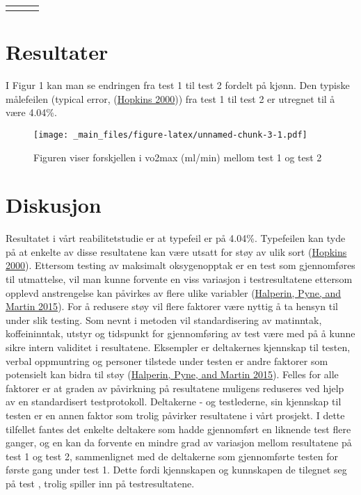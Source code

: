 \documentclass[
]{book}
\begin{document}
\begin{longtable}[c]{|p{1.08in}|p{1.02in}|p{1.02in}}
\noalign{\global\setlength{\arrayrulewidth}{2pt}}\arrayrulecolor[HTML]{666666}\cline{1-3}



\end{longtable}

\hypertarget{resultater}{%
\section{Resultater}\label{resultater}}

I Figur 1 kan man se endringen fra test 1 til test 2 fordelt på kjønn.
Den typiske målefeilen (typical error,
(\protect\hyperlink{ref-hopkins2000}{Hopkins 2000})) fra test 1 til test
2 er utregnet til å være 4.04\%.

\begin{figure}
\centering
\texttt{[image: \_main\_files/figure-latex/unnamed-chunk-3-1.pdf]}
\caption{Figuren viser forskjellen i vo2max (ml/min) mellom test 1 og
test 2}
\end{figure}

\hypertarget{diskusjon}{%
\section{Diskusjon}\label{diskusjon}}

Resultatet i vårt reabilitetstudie er at typefeil er på 4.04\%.
Typefeilen kan tyde på at enkelte av disse resultatene kan være utsatt
for støy av ulik sort (\protect\hyperlink{ref-hopkins2000}{Hopkins
2000}). Ettersom testing av maksimalt oksygenopptak er en test som
gjennomføres til utmattelse, vil man kunne forvente en viss variasjon i
testresultatene ettersom opplevd anstrengelse kan påvirkes av flere
ulike variabler (\protect\hyperlink{ref-halperin2015}{Halperin, Pyne,
and Martin 2015}). For å redusere støy vil flere faktorer være nyttig å
ta hensyn til under slik testing. Som nevnt i metoden vil
standardisering av matinntak, koffeininntak, utstyr og tidspunkt for
gjennomføring av test være med på å kunne sikre intern validitet i
resultatene. Eksempler er deltakernes kjennskap til testen, verbal
oppmuntring og personer tilstede under testen er andre faktorer som
potensielt kan bidra til støy
(\protect\hyperlink{ref-halperin2015}{Halperin, Pyne, and Martin 2015}).
Felles for alle faktorer er at graden av påvirkning på resultatene
muligens reduseres ved hjelp av en standardisert testprotokoll.
Deltakerne - og testlederne, sin kjennskap til testen er en annen faktor
som trolig påvirker resultatene i vårt prosjekt. I dette tilfellet
fantes det enkelte deltakere som hadde gjennomført en liknende test
flere ganger, og en kan da forvente en mindre grad av variasjon mellom
resultatene på test 1 og test 2, sammenlignet med de deltakerne som
gjennomførte testen for første gang under test 1. Dette fordi
kjennskapen og kunnskapen de tilegnet seg på test , trolig spiller inn
på testresultatene.
\end{document}
